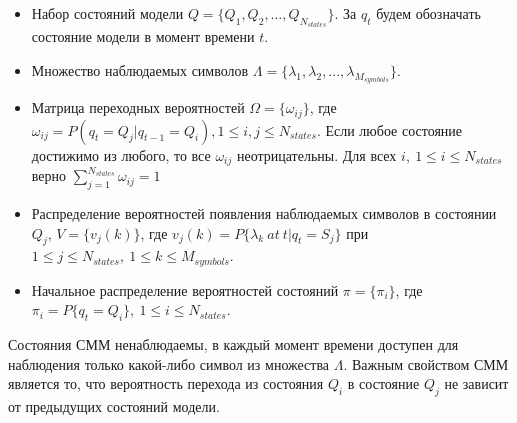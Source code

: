 \begin{itemize}

\item Набор состояний модели $Q = \{Q_1, Q_2, \ldots , Q_{N_{states}}\}$. За
$q_t$ будем обозначать состояние модели в момент времени $t$.

\item Множество наблюдаемых символов $\Lambda = \{\lambda_1, \lambda_2, ...,
\lambda_{M_{symbols}}\}$.

\item Матрица переходных вероятностей $\Omega = \{\omega_{ij}\}$, где
$\omega_{ij} = P(q_t = Q_j | q_{t-1} = Q_i), \! 1 \leq i,j \leq N_{states}$.
Если любое состояние достижимо из любого, то все $\omega_{ij}$ неотрицательны.
Для всех $i,~1 \leq i \leq {N_{states}}$ верно $\sum_{j=1}^{N_{states}}
\omega_{ij} = 1$

\item Распределение вероятностей появления наблюдаемых символов в состоянии
$Q_j$, $V=\{v_j(k)\}$, где $v_j(k) = P\{\lambda_k \: at \: t|q_t = S_j\}$ при $1
\leq j \leq N_{states}, \: 1 \leq k \leq M_{symbols}$.

\item Начальное распределение вероятностей состояний $\pi =
\{\pi_i\}$, где $\pi_i = P\{q_t = Q_i\}, \: 1 \leq i \leq N_{states}$.

\end{itemize}

Состояния СММ ненаблюдаемы, в каждый момент времени доступен для наблюдения
только какой-либо символ из множества $\Lambda$. Важным свойством СММ является
то, что вероятность перехода из состояния $Q_i$ в состояние $Q_j$ не зависит от
предыдущих состояний модели.

